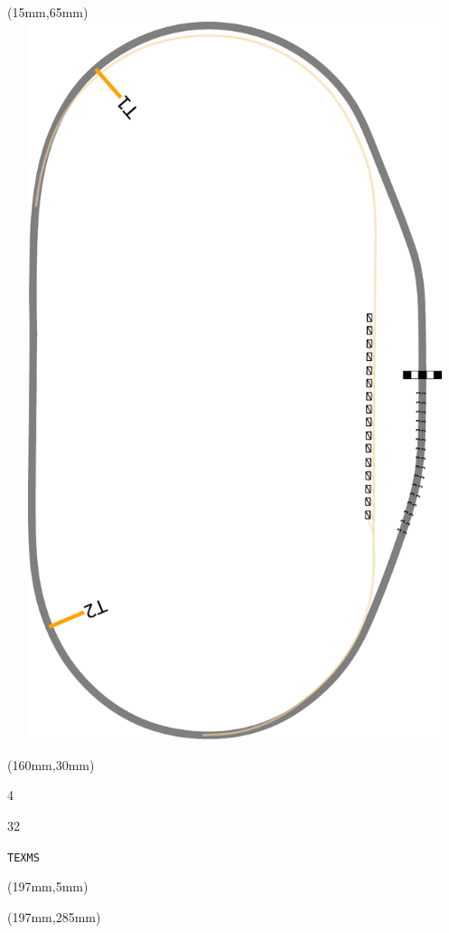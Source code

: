 \begin{textblock*}{185mm}(15mm,65mm)%
\centering
\mbox{\includegraphics[width=185mm,height=210mm,keepaspectratio]{PT/TEXMS.pdf}}
\end{textblock*}
\begin{textblock*}{40mm}(160mm,30mm)%
\Large
\par{} 
\par4 
\par32 
\par\hfill\tiny\tt TEXMS\\
\end{textblock*}
\begin{textblock*}{20mm}(197mm,5mm)%
\fbox{\thepage}
\label{TEXMS}
\end{textblock*}
\begin{textblock*}{20mm}(197mm,285mm)%
\fbox{\thepage}
\end{textblock*}

